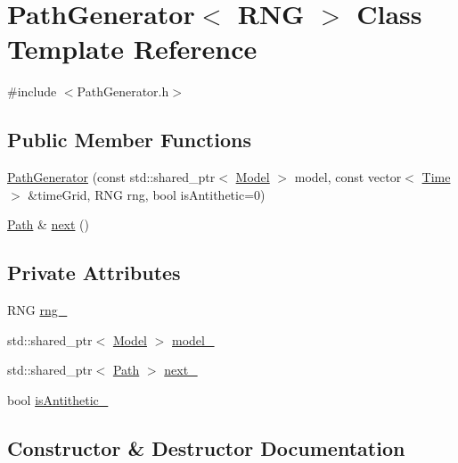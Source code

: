 \hypertarget{class_path_generator}{}\section{Path\+Generator$<$ R\+NG $>$ Class Template Reference}
\label{class_path_generator}


{\ttfamily \#include $<$Path\+Generator.\+h$>$}

\subsection*{Public Member Functions}
\begin{DoxyCompactItemize}
\item 
\hyperlink{class_path_generator_a7cd1bbe2d0d6afc8b7a6b812553deacc}{Path\+Generator} (const std\+::shared\+\_\+ptr$<$ \hyperlink{class_model}{Model} $>$ model, const vector$<$ \hyperlink{_name_def_8h_ac2d3e0ba793497bcca555c7c2cf64ff3}{Time} $>$ \&time\+Grid, R\+NG rng, bool is\+Antithetic=0)
\item 
\hyperlink{class_path}{Path} \& \hyperlink{class_path_generator_a848a4f432d86df5b03d835d99472ab37}{next} ()
\end{DoxyCompactItemize}
\subsection*{Private Attributes}
\begin{DoxyCompactItemize}
\item 
R\+NG \hyperlink{class_path_generator_ae8b29fa9173cf38dfc448375163adf25}{rng\+\_\+}
\item 
std\+::shared\+\_\+ptr$<$ \hyperlink{class_model}{Model} $>$ \hyperlink{class_path_generator_a80dcaacd0b79c84c4bf83e980f5ed7ff}{model\+\_\+}
\item 
std\+::shared\+\_\+ptr$<$ \hyperlink{class_path}{Path} $>$ \hyperlink{class_path_generator_a2af5b3cab0498565a56b20e97a3d6f35}{next\+\_\+}
\item 
bool \hyperlink{class_path_generator_aa45100f04c27cd0f25c059c410316346}{is\+Antithetic\+\_\+}
\end{DoxyCompactItemize}


\subsection{Constructor \& Destructor Documentation}
\hypertarget{class_path_generator_a7cd1bbe2d0d6afc8b7a6b812553deacc}{}\label{class_path_generator_a7cd1bbe2d0d6afc8b7a6b812553deacc} 

